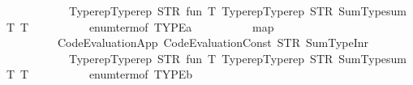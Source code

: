 \begin{isabellebody}
\ \ \ \ \ \ \ \ \ \ \ \ {\isacharparenleft}{\kern0pt}Typerep{\isachardot}{\kern0pt}Typerep\ {\isacharparenleft}{\kern0pt}STR\ {\isacharprime}{\kern0pt}{\isacharprime}{\kern0pt}fun{\isacharprime}{\kern0pt}{\isacharprime}{\kern0pt}{\isacharparenright}{\kern0pt}\ {\isacharbrackleft}{\kern0pt}T{}{\isacharcomma}{\kern0pt}\ Typerep{\isachardot}{\kern0pt}Typerep\ {\isacharparenleft}{\kern0pt}STR\ {\isacharprime}{\kern0pt}{\isacharprime}{\kern0pt}Sum{\isacharunderscore}{\kern0pt}Type{\isachardot}{\kern0pt}sum{\isacharprime}{\kern0pt}{\isacharprime}{\kern0pt}{\isacharparenright}{\kern0pt}\ {\isacharbrackleft}{\kern0pt}T{}{\isacharcomma}{\kern0pt}\ T{}{\isacharbrackright}{\kern0pt}{\isacharbrackright}{\kern0pt}{\isacharparenright}{\kern0pt}{\isacharparenright}{\kern0pt}{\isacharparenright}{\kern0pt}\isanewline
\ \ \ \ \ \ \ \ \ \ {\isacharparenleft}{\kern0pt}enum{\isacharunderscore}{\kern0pt}term{\isacharunderscore}{\kern0pt}of\ {\isacharparenleft}{\kern0pt}TYPE{\isacharparenleft}{\kern0pt}{\isacharprime}{\kern0pt}a{\isacharparenright}{\kern0pt}{\isacharparenright}{\kern0pt}\ {\isacharparenleft}{\kern0pt}{\isacharparenright}{\kern0pt}{\isacharparenright}{\kern0pt}\ {\isacharat}{\kern0pt}\isanewline
\ \ \ \ \ \ \ \ map\isanewline
\ \ \ \ \ \ \ \ \ \ {\isacharparenleft}{\kern0pt}Code{\isacharunderscore}{\kern0pt}Evaluation{\isachardot}{\kern0pt}App\ {\isacharparenleft}{\kern0pt}Code{\isacharunderscore}{\kern0pt}Evaluation{\isachardot}{\kern0pt}Const\ {\isacharparenleft}{\kern0pt}STR\ {\isacharprime}{\kern0pt}{\isacharprime}{\kern0pt}Sum{\isacharunderscore}{\kern0pt}Type{\isachardot}{\kern0pt}Inr{\isacharprime}{\kern0pt}{\isacharprime}{\kern0pt}{\isacharparenright}{\kern0pt}\isanewline
\ \ \ \ \ \ \ \ \ \ \ \ {\isacharparenleft}{\kern0pt}Typerep{\isachardot}{\kern0pt}Typerep\ {\isacharparenleft}{\kern0pt}STR\ {\isacharprime}{\kern0pt}{\isacharprime}{\kern0pt}fun{\isacharprime}{\kern0pt}{\isacharprime}{\kern0pt}{\isacharparenright}{\kern0pt}\ {\isacharbrackleft}{\kern0pt}T{}{\isacharcomma}{\kern0pt}\ Typerep{\isachardot}{\kern0pt}Typerep\ {\isacharparenleft}{\kern0pt}STR\ {\isacharprime}{\kern0pt}{\isacharprime}{\kern0pt}Sum{\isacharunderscore}{\kern0pt}Type{\isachardot}{\kern0pt}sum{\isacharprime}{\kern0pt}{\isacharprime}{\kern0pt}{\isacharparenright}{\kern0pt}\ {\isacharbrackleft}{\kern0pt}T{}{\isacharcomma}{\kern0pt}\ T{}{\isacharbrackright}{\kern0pt}{\isacharbrackright}{\kern0pt}{\isacharparenright}{\kern0pt}{\isacharparenright}{\kern0pt}{\isacharparenright}{\kern0pt}\isanewline
\ \ \ \ \ \ \ \ \ \ {\isacharparenleft}{\kern0pt}enum{\isacharunderscore}{\kern0pt}term{\isacharunderscore}{\kern0pt}of\ {\isacharparenleft}{\kern0pt}TYPE{\isacharparenleft}{\kern0pt}{\isacharprime}{\kern0pt}b{\isacharparenright}{\kern0pt}{\isacharparenright}{\kern0pt}\ {\isacharparenleft}{\kern0pt}{\isacharparenright}{\kern0pt}{\isacharparenright}{\kern0pt}{\isacharparenright}{\kern0pt}{\isachardoublequoteclose}\isanewline

\end{isabellebody}
